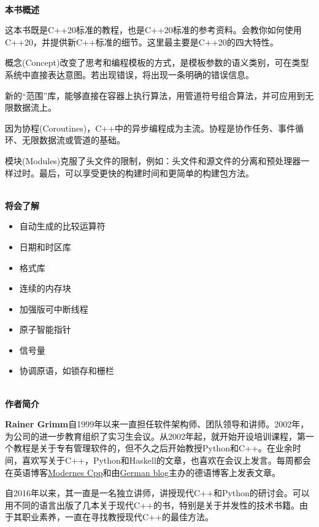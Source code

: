 \documentclass[11pt,a4paper,UTF8]{book}
\begin{document}
\begin{sloppypar}
  \hspace*{\fill} \\ %
  \noindent\textbf{本书概述}
  
  这本书既是C++20标准的教程，也是C++20标准的参考资料。会教你如何使用C++20，并提供新C++标准的细节。这里最主要是C++20的四大特性。

  概念(Concept)改变了思考和编程模板的方式，是模板参数的语义类别，可在类型系统中直接表达意图。若出现错误，将出现一条明确的错误信息。

  新的“范围”库，能够直接在容器上执行算法，用管道符号组合算法，并可应用到无限数据流上。

  因为协程(Coroutines)，C++中的异步编程成为主流。协程是协作任务、事件循环、无限数据流或管道的基础。

  模块(Modules)克服了头文件的限制，例如：头文件和源文件的分离和预处理器一样过时。最后，可以享受更快的构建时间和更简单的构建包方法。

  \hspace*{\fill} \\ %
  \noindent\textbf{将会了解}
  \begin{itemize}
    \item 自动生成的比较运算符
    \item 日期和时区库
    \item 格式库
    \item 连续的内存块
    \item 加强版可中断线程
    \item 原子智能指针
    \item 信号量
    \item 协调原语，如锁存和栅栏
  \end{itemize}
  
  \hspace*{\fill} \\ %
  \noindent\textbf{作者简介}
  
  \textbf{Rainer Grimm}自1999年以来一直担任软件架构师、团队领导和讲师。2002年，为公司的进一步教育组织了实习生会议。从2002年起，就开始开设培训课程，第一个教程是关于专有管理软件的，但不久之后开始教授Python和C++。在业余时间，喜欢写关于C++，Python和Haskell的文章，也喜欢在会议上发言。每周都会在英语博客\href{https://www.modernescpp.com/}{Modernes Cpp}和由\href{https://www.grimm-jaud.de/index.php/blog}{German blog}主办的德语博客上发表文章。
  
  自2016年以来，其一直是一名独立讲师，讲授现代C++和Python的研讨会。可以用不同的语言出版了几本关于现代C++的书，特别是关于并发性的技术书籍。由于其职业素养，一直在寻找教授现代C++的最佳方法。
  

\end{sloppypar}
\end{document}
